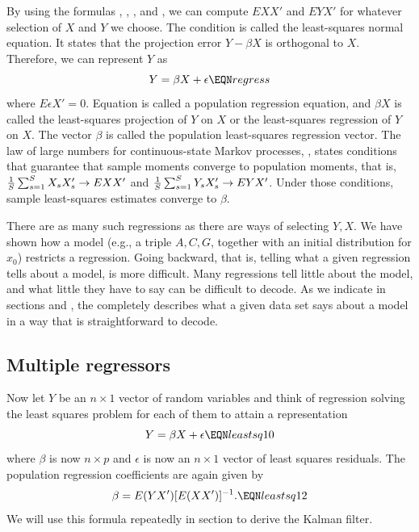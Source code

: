   By using the formulas , , ,  and
, we can compute $E  X X'$ and $E Y X'$ for whatever
selection of $X$ and $Y$ we choose. The condition  is
called the least-squares normal equation.  It states that the
projection error $Y - \beta X $ is orthogonal to $X$. Therefore,
we can represent $Y$ as
$$ Y =  \beta X + \epsilon \EQN regress $$
where $E  \epsilon X' =0$.   Equation  is called a
population regression equation, and $\beta X $ is called the least-squares
projection of $Y$ on $X$ or the least-squares regression of $Y$ on
$X$. The vector $\beta$ is called the population least-squares
regression vector.
 The law of large numbers for continuous-state Markov processes,
,
%
states conditions  that guarantee that sample moments converge to
population moments, that is, ${1 \over S} \sum_{s=1}^S  X_s X_s'
\rightarrow E  X X' $ and ${ 1\over S} \sum_{s=1}^S  Y_s X_s'
\rightarrow E  Y X'$. Under those conditions, sample least-squares
estimates converge to $\beta$. 


  There are as many such regressions  as there are ways of selecting
$Y, X$.    We have shown how a model (e.g., a triple $A, C, G$,
together with an initial distribution for $x_0$) restricts a
regression.    Going backward, that is, telling what a given
regression tells about a model, is more difficult. Many regressions tell little about the model, and what little they
have to say can be difficult to decode.    As we indicate in sections  and , the  completely describes what a given data set says about a model in a way that  is straightforward to decode.

  \subsection{Multiple regressors}
Now let $Y$ be an $n \times 1$ vector of random variables and
think of regression solving the least squares problem for each of
them to attain a representation
$$ Y = \beta X  + \epsilon \EQN leastsq10 $$
where $\beta$ is now $n \times p$ and $\epsilon$ is now an $n
\times 1$ vector of least squares residuals.  The population
regression coefficients are again given by
$$ \beta = E(Y X') [E(X X')]^{-1} . \EQN leastsq12 $$
We will use this formula repeatedly in section  to derive
the Kalman filter.%



